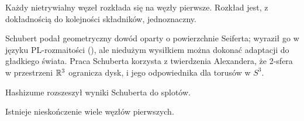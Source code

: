 \begin{theorem}[Schubert, 1949]
    Każdy nietrywialny węzeł rozkłada się na węzły pierwsze.
    Rozkład jest, z dokładnością do kolejności składników, jednoznaczny.
%
\end{theorem}

Schubert podał geometryczny dowód oparty o powierzchnie Seiferta; wyraził go w języku PL-rozmaitości (\cite{schubert49}), ale niedużym wysiłkiem można dokonać adaptacji do gładkiego świata.
Praca Schuberta korzysta z twierdzenia Alexandera, że 2-sfera w przestrzeni $\mathbb R^3$ ogranicza dysk, i jego odpowiednika dla torusów w $S^3$.

Hashizume \cite{hashizume58} rozszeszył wyniki Schuberta do splotów.

\begin{proposition}
    \label{prp:infinitely_many_prime_knots}
    Istnieje nieskończenie wiele węzłów pierwszych.
\end{proposition}

